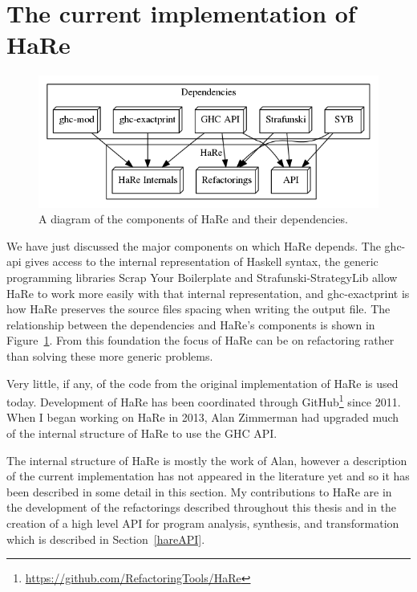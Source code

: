 \section{The current implementation of HaRe}
\label{hareCurr}

\begin{figure}[t]
	\begin{center}
		\includegraphics[scale=.4]{graphVis/Chapter2/hareDesign.png}
	\end{center}
	\caption{A diagram of the components of HaRe and their dependencies.}
	\label{design}
\end{figure}

We have just discussed the major components on which HaRe depends. The ghc-api gives access to the internal representation of Haskell syntax, the generic programming libraries Scrap Your Boilerplate and Strafunski-StrategyLib allow HaRe to work more easily with that internal representation, and ghc-exactprint is how HaRe preserves the source files spacing when writing the output file. The relationship between the dependencies and HaRe's components is shown in Figure~\ref{design}. From this foundation the focus of HaRe can be on refactoring rather than solving these more generic problems.

Very little, if any, of the code from the original implementation of HaRe is used today. Development of HaRe has been coordinated through GitHub\footnote{\url{https://github.com/RefactoringTools/HaRe}} since 2011. When I began working on HaRe in 2013, Alan Zimmerman had upgraded much of the internal structure of HaRe to use the GHC API.

The internal structure of HaRe is mostly the work of Alan, however a description of the current implementation has not appeared in the literature yet and so it has been described in some detail in this section. My contributions to HaRe are in the development of the refactorings described throughout this thesis and in the creation of a high level API for program analysis, synthesis, and transformation which is described in Section~\ref{hareAPI}.

